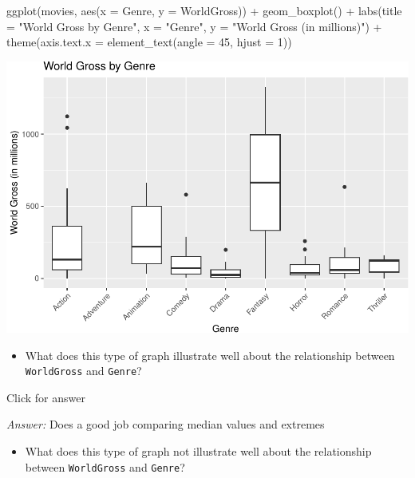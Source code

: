 \documentclass[
]{book}
\newenvironment{Shaded}{\begin{snugshade}}{\end{snugshade}}
\newcommand{\AttributeTok}[1]{\textcolor[rgb]{0.77,0.63,0.00}{#1}}
\newcommand{\DecValTok}[1]{\textcolor[rgb]{0.00,0.00,0.81}{#1}}
\newcommand{\FunctionTok}[1]{\textcolor[rgb]{0.00,0.00,0.00}{#1}}
\newcommand{\NormalTok}[1]{#1}
\newcommand{\SpecialCharTok}[1]{\textcolor[rgb]{0.00,0.00,0.00}{#1}}
\newcommand{\StringTok}[1]{\textcolor[rgb]{0.31,0.60,0.02}{#1}}
\providecommand{\tightlist}{%
  \setlength{\itemsep}{0pt}\setlength{\parskip}{0pt}}
\begin{document}
\begin{Shaded}
\begin{Highlighting}[]
\FunctionTok{ggplot}\NormalTok{(movies, }\FunctionTok{aes}\NormalTok{(}\AttributeTok{x =}\NormalTok{ Genre, }\AttributeTok{y =}\NormalTok{ WorldGross)) }\SpecialCharTok{+}
  \FunctionTok{geom\_boxplot}\NormalTok{() }\SpecialCharTok{+}
  \FunctionTok{labs}\NormalTok{(}\AttributeTok{title =} \StringTok{"World Gross by Genre"}\NormalTok{, }\AttributeTok{x =} \StringTok{"Genre"}\NormalTok{, }\AttributeTok{y =} \StringTok{"World Gross (in millions)"}\NormalTok{) }\SpecialCharTok{+}
  \FunctionTok{theme}\NormalTok{(}\AttributeTok{axis.text.x =} \FunctionTok{element\_text}\NormalTok{(}\AttributeTok{angle =} \DecValTok{45}\NormalTok{, }\AttributeTok{hjust =} \DecValTok{1}\NormalTok{))}
\end{Highlighting}
\end{Shaded}

\includegraphics[width=1\linewidth]{Class_Activity_5_files/figure-latex/unnamed-chunk-14-1}

\begin{itemize}
\tightlist
\item
  What does this type of graph illustrate well about the relationship between \texttt{WorldGross} and \texttt{Genre}?
\end{itemize}

Click for answer

\emph{Answer:} Does a good job comparing median values and extremes

\begin{itemize}
\tightlist
\item
  What does this type of graph not illustrate well about the relationship between \texttt{WorldGross} and \texttt{Genre}?
\end{itemize}
\end{document}
